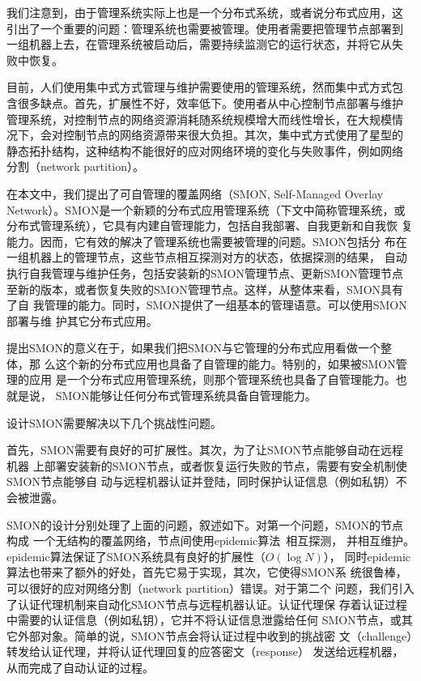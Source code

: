 我们注意到，由于管理系统实际上也是一个分布式系统，或者说分布式应用，这
引出了一个重要的问题：管理系统也需要被管理。使用者需要把管理节点部署到
一组机器上去，在管理系统被启动后，需要持续监测它的运行状态，并将它从失
败中恢复。%

目前，人们使用集中式方式管理与维护需要使用的管理系统，然而集中式方式包
含很多缺点。首先，扩展性不好，效率低下。使用者从中心控制节点部署与维护
管理系统，对控制节点的网络资源消耗随系统规模增大而线性增长，在大规模情
况下，会对控制节点的网络资源带来很大负担。其次，集中式方式使用了星型的
静态拓扑结构，这种结构不能很好的应对网络环境的变化与失败事件，例如网络
分割（network partition）。


在本文中，我们提出了可自管理的覆盖网络（SMON, Self-Managed Overlay
Network）。SMON是一个新颖的分布式应用管理系统（下文中简称管理系统，或
分布式管理系统），它具有内建自管理能力，包括自我部署、自我更新和自我恢
复能力。因而，它有效的解决了管理系统也需要被管理的问题。SMON包括分
布在一组机器上的管理节点，这些节点相互探测对方的状态，依据探测的结果，
自动执行自我管理与维护任务，包括安装新的SMON管理节点、更新SMON管理节点
至新的版本，或者恢复失败的SMON管理节点。这样，从整体来看，SMON具有了自
我管理的能力。同时，SMON提供了一组基本的管理语意。可以使用SMON部署与维
护其它分布式应用。

提出SMON的意义在于，如果我们把SMON与它管理的分布式应用看做一个整体，那
么这个新的分布式应用也具备了自管理的能力。特别的，如果被SMON管理的应用
是一个分布式应用管理系统，则那个管理系统也具备了自管理能力。也就是说，
SMON能够让任何分布式管理系统具备自管理能力。

设计SMON需要解决以下几个挑战性问题。

首先，SMON需要有良好的可扩展性。其次，为了让SMON节点能够自动在远程机器
上部署安装新的SMON节点，或者恢复运行失败的节点，需要有安全机制使SMON节点能够自
动与远程机器认证并登陆，同时保护认证信息（例如私钥）不会被泄露。

SMON的设计分别处理了上面的问题，叙述如下。对第一个问题，SMON的节点构成
一个无结构的覆盖网络，节点间使用epidemic算法~\cite{Demers1987}相互探测，
并相互维护。epidemic算法保证了SMON系统具有良好的扩展性（$O(\log N)$），
同时epidemic算法也带来了额外的好处，首先它易于实现，其次，它使得SMON系
统很鲁棒，可以很好的应对网络分割（network partition）错误。对于第二个
问题，我们引入了认证代理机制来自动化SMON节点与远程机器认证。认证代理保
存着认证过程中需要的认证信息（例如私钥），它并不将认证信息泄露给任何
SMON节点，或其它外部对象。简单的说，SMON节点会将认证过程中收到的挑战密
文（challenge）转发给认证代理，并将认证代理回复的应答密文（response）
发送给远程机器，从而完成了自动认证的过程。


